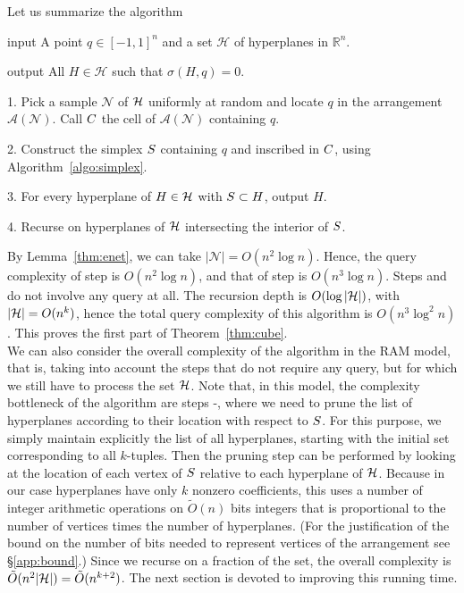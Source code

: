 Let us summarize the algorithm
\begin{algorithm}\label{algo:meiser}
\item[input] A point \(q \in {[-1,1]}^n\) and a set \(\mathcal{H}\) of hyperplanes in \(\mathbb{R}^n\).
\item[output] All \(H \in \mathcal{H}\) such that \(\sigma(H,q) = 0\).
\item[1.] Pick a sample \(\mathcal{N}\) of $\mathcal{H}$ uniformly at random and locate $q$
	in the arrangement \(\mathcal{A}(\mathcal{N})\). Call $C$ the cell of
	\(\mathcal{A}(\mathcal{N})\) containing $q$.
\item[2.] Construct the simplex \(S\) containing \(q\) and inscribed in
\(C\), using Algorithm~\ref{algo:simplex}.
\item[3.]
For every hyperplane of $H \in \mathcal{H}$ with $S \subset H$, output
	\(H\).
\item[4.] Recurse on hyperplanes of $\mathcal{H}$ intersecting the interior of $S$.
\end{algorithm}

By Lemma~\ref{thm:enet}, we can take \(| \mathcal{N} | = O(n^2 \log n)\).
Hence, the query complexity of step  is $O(n^2 \log n)$, and that of step
 is $O(n^3 \log n)$. Steps  and  do not involve any
query at all. The recursion depth is $O(\log |{\mathcal{H}}|)$, with $|\mathcal{H}|=O(n^k)$,
hence the total query complexity of this algorithm is $O(n^3 \log^2 n)$. This
proves the first part of Theorem~\ref{thm:cube}.\\

We can also consider the overall complexity of the algorithm in the RAM model,
that is, taking into account the steps that do not require any query, but for
which we still have to process the set $\mathcal{H}$. Note that, in this model,
the complexity bottleneck of the algorithm are steps -,
where we need to prune
the list of hyperplanes according to their location with respect to
$S$. For this purpose, we simply maintain explicitly the list of all
hyperplanes, starting with the initial set corresponding to all $k$-tuples.
Then the pruning step can be performed by looking at the location of each
vertex of $S$ relative to each hyperplane of $\mathcal{H}$.
Because in our case hyperplanes have only $k$ nonzero coefficients, this uses a
number of integer arithmetic operations on $\tilde{O}(n)$ bits integers that is
proportional to the number of vertices times the number of hyperplanes.
(For the justification of the bound on the number of bits needed to represent
vertices of the arrangement see \S\ref{app:bound}.)
Since we recurse on a fraction of the set, the overall complexity is
$\tilde{O}(n^2|{\mathcal{H}}|) = \tilde{O}(n^{k+2})$. The next section is devoted
to improving this running time.


